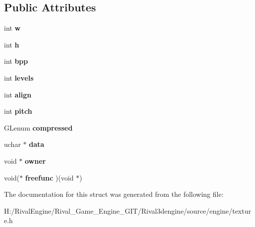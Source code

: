 \subsection*{Public Attributes}
\begin{DoxyCompactItemize}
\item 
\mbox{\label{struct_image_data_a66b309c69bee4ce43e8c9235613fbb7a}} 
int {\bfseries w}
\item 
\mbox{\label{struct_image_data_a5f69888506bd3957c885913ddc19fd6b}} 
int {\bfseries h}
\item 
\mbox{\label{struct_image_data_a5233968997e788343a6e87434a82b5e8}} 
int {\bfseries bpp}
\item 
\mbox{\label{struct_image_data_ab46c6cb4039df60be1ffb5e50c01b3c1}} 
int {\bfseries levels}
\item 
\mbox{\label{struct_image_data_a0983fca58758b02e90d48f90d08af2b6}} 
int {\bfseries align}
\item 
\mbox{\label{struct_image_data_a22d891065745d4602f4b688a0dc7d3e8}} 
int {\bfseries pitch}
\item 
\mbox{\label{struct_image_data_a1cc31e49de877cfac81dd5aa0f7f8ff4}} 
G\+Lenum {\bfseries compressed}
\item 
\mbox{\label{struct_image_data_ad419767f541b51593924ad5268cb65d4}} 
uchar $\ast$ {\bfseries data}
\item 
\mbox{\label{struct_image_data_a0b59b1340cd6e0e44d389f870a354401}} 
void $\ast$ {\bfseries owner}
\item 
\mbox{\label{struct_image_data_aac1bdbc490ae646383ff981d4b4e7a7c}} 
void($\ast$ {\bfseries freefunc} )(void $\ast$)
\end{DoxyCompactItemize}


The documentation for this struct was generated from the following file\+:\begin{DoxyCompactItemize}
\item 
H\+:/\+Rival\+Engine/\+Rival\+\_\+\+Game\+\_\+\+Engine\+\_\+\+G\+I\+T/\+Rival3dengine/source/engine/texture.\+h\end{DoxyCompactItemize}
